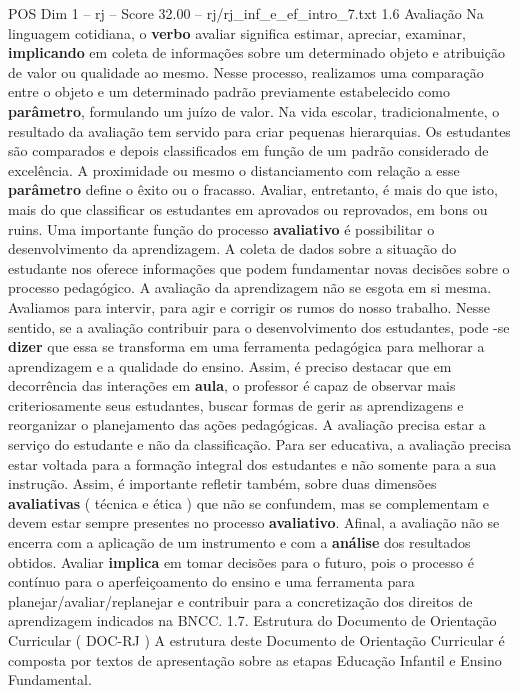 \begin{textsample}{POS Dim 1 – rj – Score 32.00 – rj/rj\_inf\_e\_ef\_intro\_7.txt}  \label{ex:f1_pos_277}
1.6 Avaliação Na linguagem cotidiana, o \textbf{verbo} avaliar significa estimar, apreciar, examinar, \textbf{implicando} em coleta de informações sobre um determinado objeto e atribuição de valor ou qualidade ao mesmo.
Nesse processo, realizamos uma comparação entre o objeto e um determinado padrão previamente estabelecido como \textbf{parâmetro}, formulando um juízo de valor.
Na vida escolar, tradicionalmente, o resultado da avaliação tem servido para criar pequenas hierarquias.
Os estudantes são comparados e depois classificados em função de um padrão considerado de excelência.
A proximidade ou mesmo o distanciamento com relação a esse \textbf{parâmetro} define o êxito ou o fracasso.
Avaliar, entretanto, é mais do que isto, mais do que classificar os estudantes em aprovados ou reprovados, em bons ou ruins.
Uma importante função do processo \textbf{avaliativo} é possibilitar o desenvolvimento da aprendizagem.
A coleta de dados sobre a situação do estudante nos oferece informações que podem fundamentar novas decisões sobre o processo pedagógico.
A avaliação da aprendizagem não se esgota em si mesma.
Avaliamos para intervir, para agir e corrigir os rumos do nosso trabalho.
Nesse sentido, se a avaliação contribuir para o desenvolvimento dos estudantes, pode -se \textbf{dizer} que essa se transforma em uma ferramenta pedagógica para melhorar a aprendizagem e a qualidade do ensino.
Assim, é preciso destacar que em decorrência das interações em \textbf{aula}, o professor é capaz de observar mais criteriosamente seus estudantes, buscar formas de gerir as aprendizagens e reorganizar o planejamento das ações pedagógicas.
A avaliação precisa estar a serviço do estudante e não da classificação.
Para ser educativa, a avaliação precisa estar voltada para a formação integral dos estudantes e não somente para a sua instrução.
Assim, é importante refletir também, sobre duas dimensões \textbf{avaliativas} ( técnica e ética ) que não se confundem, mas se complementam e devem estar sempre presentes no processo \textbf{avaliativo}.
Afinal, a avaliação não se encerra com a aplicação de um instrumento e com a \textbf{análise} dos resultados obtidos.
Avaliar \textbf{implica} em tomar decisões para o futuro, pois o processo é contínuo para o aperfeiçoamento do ensino e uma ferramenta para planejar/avaliar/replanejar e contribuir para a concretização dos direitos de aprendizagem indicados na BNCC. 1.7.
Estrutura do Documento de Orientação Curricular ( DOC-RJ ) A estrutura deste Documento de Orientação Curricular é composta por textos de apresentação sobre as etapas Educação Infantil e Ensino Fundamental.

\end{textsample}
